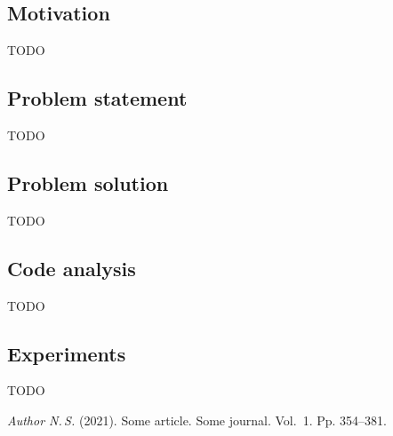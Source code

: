 \documentclass[../main.tex]{subfiles}
\begin{document}
\subsection{Motivation}

TODO

\subsection{Problem statement}

TODO

\subsection{Problem solution}

TODO

\subsection{Code analysis}

TODO

\subsection{Experiments}

TODO

\begin{thebibliography}{99}
	\textit{Author N.\,S.}  (2021). Some article. Some journal. Vol.~1. Pp. 354--381.
\end{thebibliography}
\end{document}

